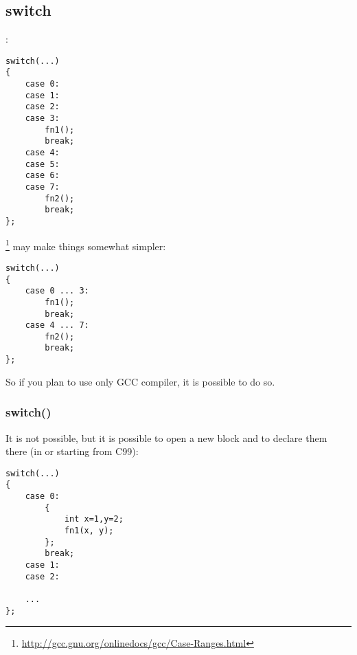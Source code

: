 ﻿\subsection{switch}

:

\begin{lstlisting}
switch(...)
{
	case 0:
	case 1:
	case 2:
	case 3:
		fn1();
		break;
	case 4:
	case 5:
	case 6:
	case 7:
		fn2();
		break;
};
\end{lstlisting}

\footnote{\url{http://gcc.gnu.org/onlinedocs/gcc/Case-Ranges.html}} 
{may make things somewhat simpler}:

\begin{lstlisting}
switch(...)
{
	case 0 ... 3:
		fn1();
		break;
	case 4 ... 7:
		fn2();
		break;
};
\end{lstlisting}

{So if you plan to use only \ac{GCC} compiler, it is possible to do so}.

\subsubsection{ switch()}

{It is not possible, but it is possible to open a new block and to declare them there (in \CPP or starting from
C99)}:

\begin{lstlisting}
switch(...)
{
	case 0:
		{
			int x=1,y=2;
			fn1(x, y);
		};
		break;
	case 1:
	case 2:

	...
};
\end{lstlisting}


